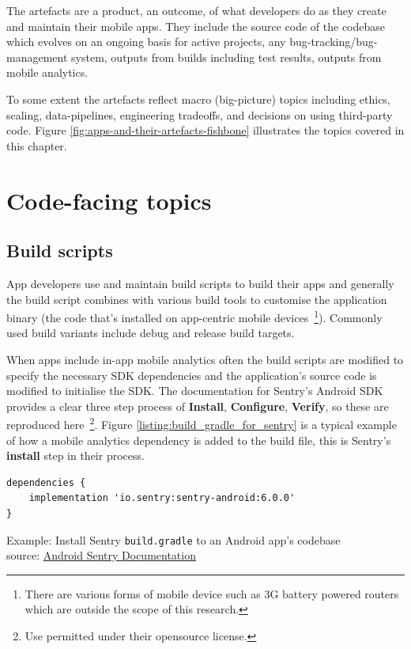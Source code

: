 The artefacts are a product, an outcome, of what developers do as they create and maintain their mobile apps. They include the source code of the codebase which evolves on an ongoing basis for active projects, any bug-tracking/bug-management system, outputs from builds including test results, outputs from mobile analytics. 

To some extent the artefacts reflect macro (big-picture) topics including ethics, scaling, data-pipelines, engineering tradeoffs, and decisions on using third-party code. Figure \ref{fig:apps-and-their-artefacts-fishbone} illustrates the topics covered in this chapter.


\section{Code-facing topics}
\subsection{Build scripts}
App developers use and maintain build scripts to build their apps and generally the build script combines with various build tools to customise the application binary (the code that's installed on app-centric mobile devices~\footnote{There are various forms of mobile device such as 3G battery powered routers which are outside the scope of this research.}). Commonly used build variants include debug and release build targets. 

When apps include in-app mobile analytics often the build scripts are modified to specify the necessary SDK dependencies and the application's source code is modified to initialise the SDK. The documentation for Sentry's Android SDK provides a clear three step process of \textbf{Install}, \textbf{Configure}, \textbf{Verify}, so these are reproduced here~\footnote{Use permitted under their opensource license.}. Figure \ref{listing:build_gradle_for_sentry} is a typical example of how a mobile analytics dependency is added to the build file, this is Sentry's \textbf{install} step in their process.

\begin{listing}
\begin{verbatim}
dependencies {
    implementation 'io.sentry:sentry-android:6.0.0'
}
\end{verbatim}
\caption{Example: Install Sentry \texttt{build.gradle} to an Android app's codebase\\source: \href{https://docs.sentry.io/platforms/android/}{Android Sentry Documentation}}
\label{listing:build_gradle_for_sentry}
\end{listing}

